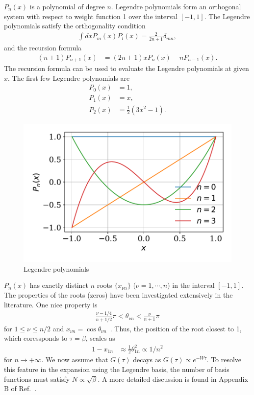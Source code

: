 \documentclass[submission, LectureNotes]{SciPost}
\begin{document}
$P_n(x)$ is a polynomial of degree $n$.
Legendre polynomials form an orthogonal system with respect to weight function 1 over the interval $[-1,1]$.
The Legendre polynomials satisfy the orthogonality condition
\begin{align}
    \int d x P_m(x) P_l(x) = \frac{2}{2n+1} \delta_{mn},
\end{align}
and the recursion formula
\begin{align}
    (n+1)P_{n+1}(x) &= (2n+1) x P_n(x) - n P_{n-1}(x).
\end{align}
The recursion formula can be used to evaluate the Legendre polynomials at given $x$.
The first few Legendre polynomials are 
\begin{align}
    P_0(x) &= 1,\\
    P_1(x) &= x,\\
    P_2(x) &= \frac{1}{2}(3x^2-1).
\end{align}
\begin{figure}[h]
    \centering
    \includegraphics[width=0.6\columnwidth]{legendre_polynomials.pdf}
    \caption{Legendre polynomials}
    \label{fig:legendre_polynomials}
\end{figure}

$P_n(x)$ has exactly distinct $n$ roots $\{x_{\nu n}\}$ ($\nu=1,\cdots,n$) in the interval $[-1,1]$.
The properties of the roots (zeros) have been investigated extensively in the literature.
One nice property is 
\begin{align}
    \frac{\nu-1/4}{n+1/2} \pi < \theta_{\nu n} < \frac{\nu}{n+1}\pi
\end{align}
for $1 \le \nu \le n/2$ and $x_{\nu n} = \cos \theta_{\nu n}$~\cite{Szego.1936.Szego}.
Thus, the position of the root closest to 1, which coressponds to $\tau=\beta$, scales as
\begin{align}
    1-x_{1 n} &\approx \frac{1}{2}\theta_{1 n}^2 \propto 1/n^2
\end{align}
for $n\rightarrow +\infty$.
We now assume that $G(\tau)$ decays as $G(\tau) \propto e^{-W\tau}$.
To resolve this feature in the expansion using the Legendre basis,
the number of basis functions must satisfy $N \propto \sqrt{\beta}$.
A more detailed discussion is found in Appendix B of Ref.~\cite{Chikano:2018gd}.
\end{document}
